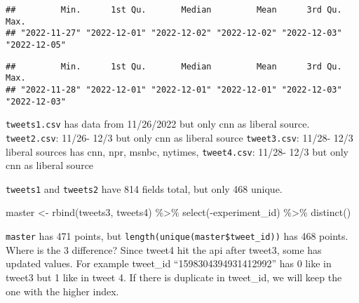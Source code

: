 \documentclass[
]{article}
\newenvironment{Shaded}{\begin{snugshade}}{\end{snugshade}}
\newcommand{\FunctionTok}[1]{\textcolor[rgb]{0.00,0.00,0.00}{#1}}
\newcommand{\NormalTok}[1]{#1}
\newcommand{\OtherTok}[1]{\textcolor[rgb]{0.56,0.35,0.01}{#1}}
\newcommand{\SpecialCharTok}[1]{\textcolor[rgb]{0.00,0.00,0.00}{#1}}
\begin{document}
\begin{Shaded}
\end{Shaded}

\begin{verbatim}
##         Min.      1st Qu.       Median         Mean      3rd Qu.         Max. 
## "2022-11-27" "2022-12-01" "2022-12-02" "2022-12-02" "2022-12-03" "2022-12-05"
\end{verbatim}

\begin{Shaded}
\end{Shaded}

\begin{verbatim}
##         Min.      1st Qu.       Median         Mean      3rd Qu.         Max. 
## "2022-11-28" "2022-12-01" "2022-12-01" "2022-12-01" "2022-12-03" "2022-12-03"
\end{verbatim}

\texttt{tweets1.csv} has data from 11/26/2022 but only cnn as liberal
source. \texttt{tweet2.csv}: 11/26- 12/3 but only cnn as liberal source
\texttt{tweet3.csv}: 11/28- 12/3 liberal sources has cnn, npr, msnbc,
nytimes, \texttt{tweet4.csv}: 11/28- 12/3 but only cnn as liberal source

\texttt{tweets1} and \texttt{tweets2} have 814 fields total, but only
468 unique.

\begin{Shaded}
\begin{Highlighting}[]
\NormalTok{master }\OtherTok{\textless{}{-}} \FunctionTok{rbind}\NormalTok{(tweets3, tweets4) }\SpecialCharTok{\%\textgreater{}\%} \FunctionTok{select}\NormalTok{(}\SpecialCharTok{{-}}\NormalTok{experiment\_id) }\SpecialCharTok{\%\textgreater{}\%} \FunctionTok{distinct}\NormalTok{()}
\end{Highlighting}
\end{Shaded}

\texttt{master} has 471 points, but
\texttt{length(unique(master\$tweet\_id))} has 468 points. Where is the
3 difference? Since tweet4 hit the api after tweet3, some has updated
values. For example tweet\_id ``1598304394931412992'' has 0 like in
tweet3 but 1 like in tweet 4. If there is duplicate in tweet\_id, we
will keep the one with the higher index.
\end{document}
